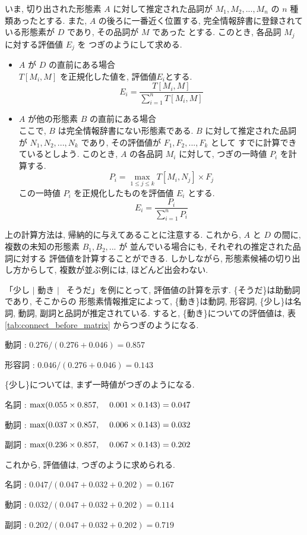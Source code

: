 いま, 切り出された形態素 $A$ に対して推定された品詞が
$M_1,M_2,...,M_n$ の $n$ 種類あったとする. また, 
$A$ の後ろに一番近く位置する, 
完全情報辞書に登録されている形態素が $D$ であり, その品詞が $M$ であった
とする. このとき, 各品詞 $M_j$ に対する評価値 $E_j$ を
つぎのようにして求める. 

\begin{itemize}
\item $A$ が $D$ の直前にある場合 \\
$T[M_i,M]$ を正規化した値を, 評価値$E_i$とする.
$$E_i = \frac{T[M_i,M]}{\sum_{i=1}^n T[M_i,M]}$$
\item $A$ が他の形態素 $B$ の直前にある場合 \\
ここで, $B$ は完全情報辞書にない形態素である. 
$B$ に対して推定された品詞が $N_1,N_2,...,N_k$ 
であり, その評価値が  $F_1,F_2,...,F_k$ として
すでに計算できているとしよう. 
このとき, $A$ の各品詞 $M_i$ に対して, つぎの一時値 $P_i$ を計算する. 
$$P_i=\max_{1\leq j \leq k} T[M_i,N_j] \times F_j $$
この一時値 $P_i$ を正規化したものを評価値 $E_i$ とする. 
$$E_i = \frac{P_i}{\sum_{i=1}^n P_i}$$
\end{itemize}

上の計算方法は, 帰納的に与えてあることに注意する. 
これから, $A$ と $D$ の間に, 
複数の未知の形態素 $B_1,B_2,...$ が
並んでいる場合にも, それぞれの推定された品詞に対する
評価値を計算することができる. しかしながら, 
形態素候補の切り出し方からして, 
複数が並ぶ例には, ほどんど出会わない. 

「少し $\mid$  動き $\mid$ \ そうだ」を例にとって, 
評価値の計算を示す. \{そうだ\}は助動詞であり, そこからの
形態素情報推定によって, \{動き\}は動詞, 形容詞, 
\{少し\}は名詞, 動詞, 副詞と品詞が推定されている. 
すると, \{動き\}についての評価値は, 
表\ref{tab:connect_before_matrix} からつぎのようになる. 
\begin{description}
\item
 動詞 : $0.276/(0.276+0.046) = 0.857 $
\item
 形容詞 : $0.046/(0.276+0.046) = 0.143 $
\end{description}
\{少し\}については, まず一時値がつぎのようになる. 
\begin{description}
\item
名詞 : $\max (0.055 \times 0.857,\hspace*{0.4cm}0.001 \times 0.143) = 0.047 $
\item
動詞 : $\max (0.037 \times 0.857,\hspace*{0.4cm}0.006 \times 0.143) = 0.032 $
\item
副詞 : $\max (0.236 \times 0.857,\hspace*{0.4cm}0.067 \times 0.143) = 0.202 $
\end{description}
これから, 評価値は, つぎのように求められる. 
\begin{description}
\item
名詞 : $0.047/(0.047 + 0.032 + 0.202) = 0.167 $
\item
動詞 : $0.032/(0.047 + 0.032 + 0.202) = 0.114 $
\item
副詞 : $ 0.202/(0.047 + 0.032 + 0.202) = 0.719 $
\end{description}

